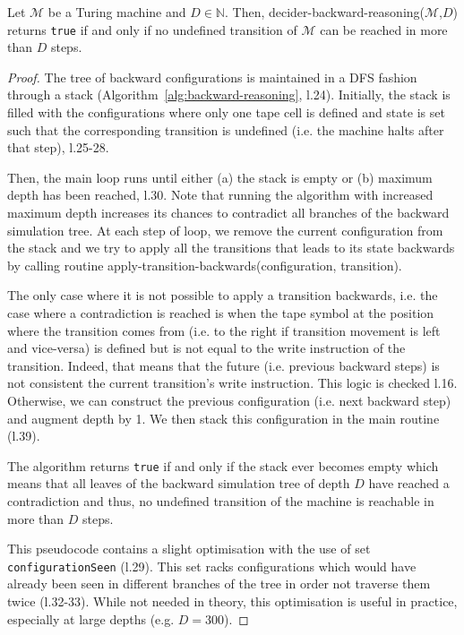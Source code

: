 \begin{theorem}\label{th:backward-reasoning}\normalfont
  Let $\mathcal{M}$ be a Turing machine and $D\in\mathbb{N}$.
  Then, {\sc decider-backward-reasoning}($\mathcal{M}$,$D$) returns \texttt{true} if and only if no undefined transition of $\mathcal{M}$ can be reached in more than $D$ steps.
\end{theorem}
\begin{proof}
The tree of backward configurations is maintained in a DFS fashion through a stack (Algorithm~\ref{alg:backward-reasoning}, l.24). Initially, the stack is filled with the configurations where only one tape cell is defined and state is set such that the corresponding transition is undefined (i.e. the machine halts after that step), l.25-28. 

Then, the main loop runs until either (a) the stack is empty or (b) maximum depth has been reached, l.30. Note that running the algorithm with increased maximum depth increases its chances to contradict all branches of the backward simulation tree. At each step of loop, we remove the current configuration from the stack and we try to apply all the transitions that leads to its state backwards by calling routine {\sc apply-transition-backwards}(configuration, transition).

The only case where it is not possible to apply a transition backwards, i.e. the case where a contradiction is reached is when the tape symbol at the position where the transition comes from (i.e. to the right if transition movement is left and vice-versa) is defined but is not equal to the write instruction of the transition. Indeed, that means that the future (i.e. previous backward steps) is not consistent the current transition's write instruction. This logic is checked l.16. Otherwise, we can construct the previous configuration (i.e. next backward step) and augment depth by 1. We then stack this configuration in the main routine (l.39).

The algorithm returns \texttt{true} if and only if the stack ever becomes empty which means that all leaves of the backward simulation tree of depth $D$ have reached a contradiction and thus, no undefined transition of the machine is reachable in more than $D$ steps.

This pseudocode contains a slight optimisation with the use of set \texttt{configurationSeen} (l.29). This set racks configurations which would have already been seen in different branches of the tree in order not traverse them twice (l.32-33). While not needed in theory, this optimisation is useful in practice, especially at large depths (e.g. $D=300$).
\end{proof}

